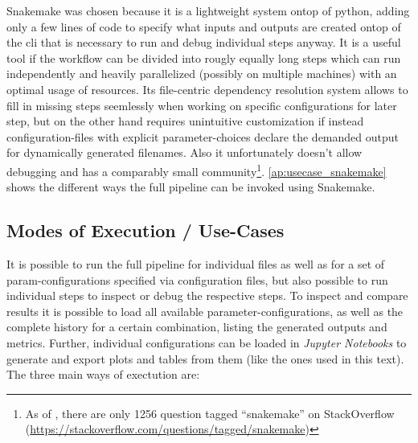 Snakemake was chosen because it is a lightweight system ontop of python, adding only a few lines of code to specify what inputs and outputs are created ontop of the \gls{cli} that is necessary to run and debug individual steps anyway. It is a useful tool if the workflow can be divided into rougly equally long steps which can run independently and heavily parallelized (possibly on multiple machines) with an optimal usage of resources. Its file-centric dependency resolution system allows to fill in missing steps seemlessly when working on specific configurations for later step, but on the other hand requires unintuitive customization if instead configuration-files with explicit parameter-choices declare the demanded output for dynamically generated filenames. Also it unfortunately doesn't allow debugging and has a comparably small community\footnote{As of , there are only 1256 question tagged ``snakemake'' on StackOverflow (\url{https://stackoverflow.com/questions/tagged/snakemake})}. \autoref{ap:usecase_snakemake} shows the different ways the full pipeline can be invoked using Snakemake.



\subsection{Modes of Execution / Use-Cases}

It is possible to run the full pipeline for individual files as well as for a set of \gls{param}-configurations specified via configuration files, but also possible to run individual steps to inspect or debug the respective steps. To inspect and compare results it is possible to load all available parameter-configurations, as well as the complete history for a certain combination, listing the generated outputs and metrics. Further, individual configurations can be loaded in \emph{Jupyter Notebooks} to generate and export plots and tables from them (like the ones used in this text). The three main ways of exectution are:

